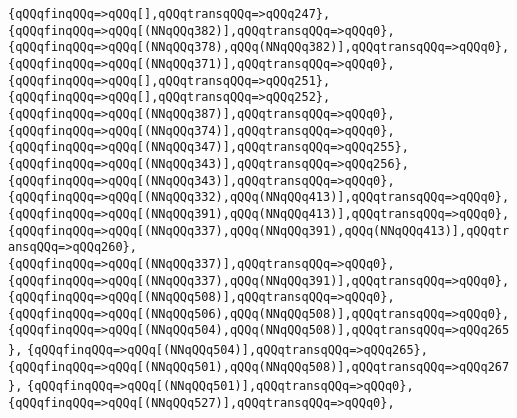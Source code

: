 \verb|{qQQqfinqQQq=>qQQq[],qQQqtransqQQq=>qQQq247},|\newline
\verb|{qQQqfinqQQq=>qQQq[(NNqQQq382)],qQQqtransqQQq=>qQQq0},|\newline
\verb|{qQQqfinqQQq=>qQQq[(NNqQQq378),qQQq(NNqQQq382)],qQQqtransqQQq=>qQQq0},|\newline
\verb|{qQQqfinqQQq=>qQQq[(NNqQQq371)],qQQqtransqQQq=>qQQq0},|\newline
\verb|{qQQqfinqQQq=>qQQq[],qQQqtransqQQq=>qQQq251},|\newline
\verb|{qQQqfinqQQq=>qQQq[],qQQqtransqQQq=>qQQq252},|\newline
\verb|{qQQqfinqQQq=>qQQq[(NNqQQq387)],qQQqtransqQQq=>qQQq0},|\newline
\verb|{qQQqfinqQQq=>qQQq[(NNqQQq374)],qQQqtransqQQq=>qQQq0},|\newline
\verb|{qQQqfinqQQq=>qQQq[(NNqQQq347)],qQQqtransqQQq=>qQQq255},|\newline
\verb|{qQQqfinqQQq=>qQQq[(NNqQQq343)],qQQqtransqQQq=>qQQq256},|\newline
\verb|{qQQqfinqQQq=>qQQq[(NNqQQq343)],qQQqtransqQQq=>qQQq0},|\newline
\verb|{qQQqfinqQQq=>qQQq[(NNqQQq332),qQQq(NNqQQq413)],qQQqtransqQQq=>qQQq0},|\newline
\verb|{qQQqfinqQQq=>qQQq[(NNqQQq391),qQQq(NNqQQq413)],qQQqtransqQQq=>qQQq0},|\newline
\verb|{qQQqfinqQQq=>qQQq[(NNqQQq337),qQQq(NNqQQq391),qQQq(NNqQQq413)],qQQqtransqQQq=>qQQq260},|\newline
\verb|{qQQqfinqQQq=>qQQq[(NNqQQq337)],qQQqtransqQQq=>qQQq0},|\newline
\verb|{qQQqfinqQQq=>qQQq[(NNqQQq337),qQQq(NNqQQq391)],qQQqtransqQQq=>qQQq0},|\newline
\verb|{qQQqfinqQQq=>qQQq[(NNqQQq508)],qQQqtransqQQq=>qQQq0},|\newline
\verb|{qQQqfinqQQq=>qQQq[(NNqQQq506),qQQq(NNqQQq508)],qQQqtransqQQq=>qQQq0},|\newline
\verb|{qQQqfinqQQq=>qQQq[(NNqQQq504),qQQq(NNqQQq508)],qQQqtransqQQq=>qQQq265},|\newline
\verb|{qQQqfinqQQq=>qQQq[(NNqQQq504)],qQQqtransqQQq=>qQQq265},|\newline
\verb|{qQQqfinqQQq=>qQQq[(NNqQQq501),qQQq(NNqQQq508)],qQQqtransqQQq=>qQQq267},|\newline
\verb|{qQQqfinqQQq=>qQQq[(NNqQQq501)],qQQqtransqQQq=>qQQq0},|\newline
\verb|{qQQqfinqQQq=>qQQq[(NNqQQq527)],qQQqtransqQQq=>qQQq0},|\newline
